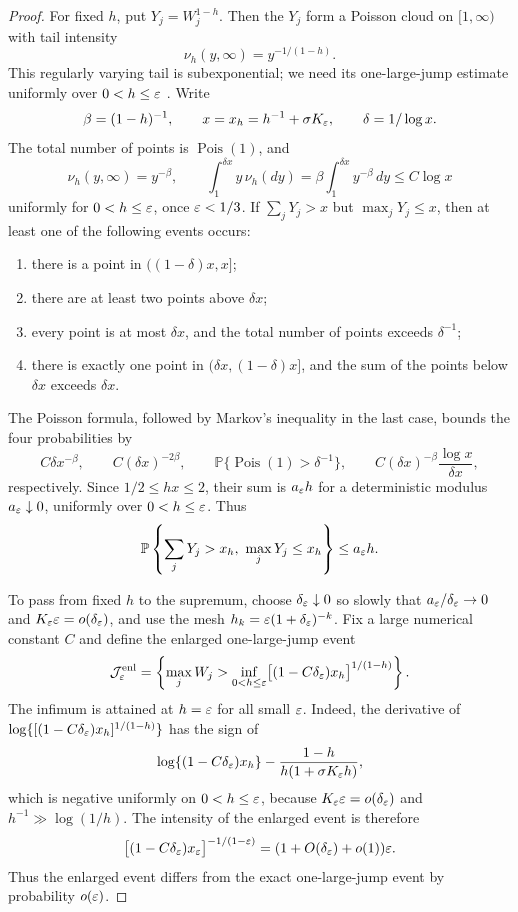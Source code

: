 \begin{proof}
For fixed $h$, put $Y_j=W_j^{1-h}$. Then the $Y_j$ form a Poisson cloud on $[1,\infty)$ with tail intensity
\[
    \nu_h(y,\infty)=y^{-1/(1-h)}.
\]
This regularly varying tail is subexponential; we need its one-large-jump
estimate uniformly over \(0<h\le\varepsilon\)
\cite[Chapter~4]{foss2013introduction}. Write
\[
 \beta=(1-h)^{-1},\qquad
 x=x_h=h^{-1}+\sigma K_\varepsilon,\qquad
 \delta=1/\log x.
\]
The total number
of points is \(\operatorname{Pois}(1)\), and
\[
    \nu_h(y,\infty)=y^{-\beta},
    \qquad
    \int_1^{\delta x}y\,\nu_h(dy)
    =
    \beta\int_1^{\delta x}y^{-\beta}\,dy
    \le C\log x
\]
uniformly for \(0<h\le\varepsilon\), once \(\varepsilon<1/3\). If
\(\sum_jY_j>x\) but \(\max_jY_j\le x\), then at least one of the following
events occurs:
\begin{enumerate}
\item there is a point in \(((1-\delta)x,x]\);
\item there are at least two points above \(\delta x\);
\item every point is at most \(\delta x\), and the total number of points
      exceeds \(\delta^{-1}\);
\item there is exactly one point in \((\delta x,(1-\delta)x]\), and the sum
      of the points below \(\delta x\) exceeds \(\delta x\).
\end{enumerate}
The Poisson formula, followed by Markov's inequality in the last case, bounds
the four probabilities by
\[
    C\delta x^{-\beta},\qquad
    C(\delta x)^{-2\beta},\qquad
    \mathbb P\{\operatorname{Pois}(1)>\delta^{-1}\},\qquad
    C(\delta x)^{-\beta}\frac{\log x}{\delta x},
\]
respectively. Since \(1/2\le hx\le2\), their sum is \(a_\varepsilon h\) for a
deterministic modulus \(a_\varepsilon\downarrow0\), uniformly over
\(0<h\le\varepsilon\). Thus
\[
    \mathbb P\left\{
        \sum_jY_j>x_h,\
        \max_jY_j\le x_h
    \right\}
    \le a_\varepsilon h.
\]

To pass from fixed \(h\) to the supremum, choose
\(\delta_\varepsilon\downarrow0\) so slowly that
\(a_\varepsilon/\delta_\varepsilon\to0\) and \(K_\varepsilon\varepsilon=o(\delta_\varepsilon)\), and use the mesh
\(h_k=\varepsilon(1+\delta_\varepsilon)^{-k}\). Fix a large numerical constant \(C\) and
define the enlarged one-large-jump event
\[
 \mathcal J_\varepsilon^{\rm enl}
 =
 \left\{\max_jW_j>
 \inf_{0<h\le\varepsilon}
 \bigl[(1-C\delta_\varepsilon)x_h\bigr]^{1/(1-h)}
 \right\}.
\]
The infimum is attained at \(h=\varepsilon\) for all small \(\varepsilon\). Indeed, the
derivative of
\(\log\{[(1-C\delta_\varepsilon)x_h]^{1/(1-h)}\}\) has the sign of
\[
 \log\{(1-C\delta_\varepsilon)x_h\}
 -\frac{1-h}{h(1+\sigma K_\varepsilon h)},
\]
which is negative uniformly on \(0<h\le\varepsilon\), because
\(K_\varepsilon\varepsilon=o(\delta_\varepsilon)\) and
\(h^{-1}\gg\log(1/h)\). The intensity of the enlarged event is therefore
\[
 \bigl[(1-C\delta_\varepsilon)x_\varepsilon\bigr]^{-1/(1-\varepsilon)}
 =(1+O(\delta_\varepsilon)+o(1))\varepsilon.
\]
Thus the enlarged event differs from the exact one-large-jump event by probability
\(o(\varepsilon)\).


\end{proof}
